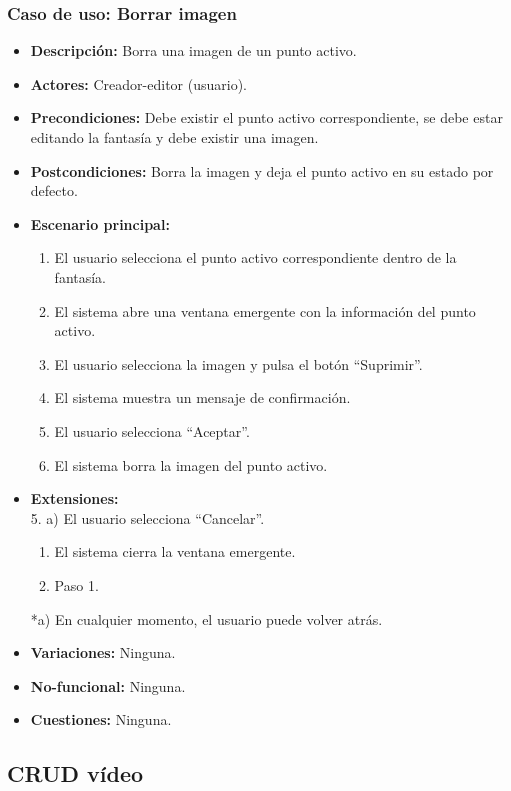 \subsubsection{Caso de uso: Borrar imagen}
\begin{itemize}
	\item \textbf{Descripción:} Borra una imagen de un punto activo.
	\item \textbf{Actores:} Creador-editor (usuario).
	\item \textbf{Precondiciones:} Debe existir el punto activo correspondiente, se debe estar editando la fantasía y debe existir una imagen.
	\item \textbf{Postcondiciones:} Borra la imagen y deja el punto activo en su estado por defecto.
	\item \textbf{Escenario principal:}
	\begin{enumerate}
		\item El usuario selecciona el punto activo correspondiente dentro de la fantasía.
		\item El sistema abre una ventana emergente con la información del punto activo.
		\item El usuario selecciona la imagen y pulsa el botón ``Suprimir''.
		\item El sistema muestra un mensaje de confirmación.
		\item El usuario selecciona ``Aceptar''.
		\item El sistema borra la imagen del punto activo.
	\end{enumerate}
	\item \textbf{Extensiones:} \\ 5. a) El usuario selecciona ``Cancelar''.
	\begin{enumerate}
		\item El sistema cierra la ventana emergente.
		\item Paso 1.
	\end{enumerate}
	*a) En cualquier momento, el usuario puede volver atrás.
	\item \textbf{Variaciones:} Ninguna.
	\item \textbf{No-funcional:} Ninguna.
	\item \textbf{Cuestiones:} Ninguna.
\end{itemize}

\subsection{CRUD vídeo}
\hypertarget{crearvideo}{}
